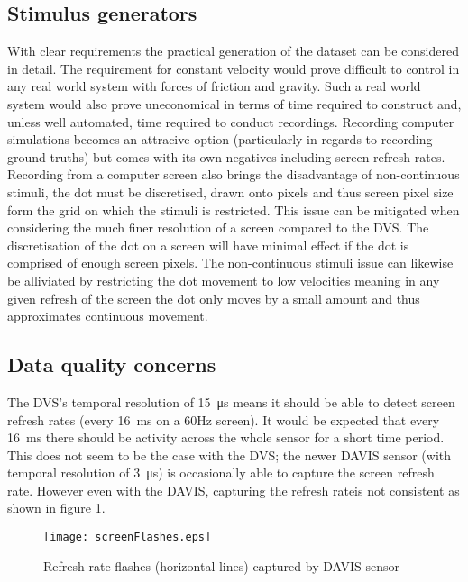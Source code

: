\subsection{Stimulus generators}
With clear requirements the practical generation of the dataset can be considered in detail.
The requirement for constant velocity would prove difficult to control in any real world system with forces of friction and gravity.
Such a real world system would also prove uneconomical in terms of time required to construct and, unless well automated, time required to conduct recordings. 
Recording computer simulations becomes an attracive option (particularly in regards to recording ground truths) but comes with its own negatives including screen refresh rates.
Recording from a computer screen also brings the disadvantage of non-continuous stimuli, the dot must be discretised, drawn onto pixels and thus screen pixel size form the grid on which the stimuli is restricted. 
This issue can be mitigated when considering the much finer resolution of a screen compared to the DVS.
The discretisation of the dot on a screen will have minimal effect if the dot is comprised of enough screen pixels.
The non-continuous stimuli issue can likewise be alliviated by restricting the dot movement to low velocities meaning in any given refresh of the screen the dot only moves by a small amount and thus approximates continuous movement. 


\subsection{Data quality concerns}

The DVS's temporal resolution of \SI{15}{\micro\second} means it should be able to detect screen refresh rates (every \SI{16}{\milli\second} on a 60Hz screen). 
It would be expected that every \SI{16}{\milli\second} there should be activity across the whole sensor for a short time period. 
This does not seem to be the case with the DVS; the newer DAVIS sensor (with temporal resolution of \SI{3}{\micro\second}) is occasionally able to capture the screen refresh rate. 
However even with the DAVIS, capturing the refresh rateis not consistent as shown in figure \ref{fig:refreshFlashes}.


\begin{figure}
    \centering
    \texttt{[image: screenFlashes.eps]}
    \caption{Refresh rate flashes (horizontal lines) captured by DAVIS sensor}
    \label{fig:refreshFlashes}
\end{figure}

